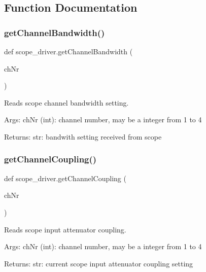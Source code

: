 \subsection{Function Documentation}
\mbox{\label{namespacescope__driver_abaaffe8208b3e65a883429b67db3efb2}} 
\subsubsection{\texorpdfstring{get\+Channel\+Bandwidth()}{getChannelBandwidth()}}
{\footnotesize\ttfamily def scope\+\_\+driver.\+get\+Channel\+Bandwidth (\begin{DoxyParamCaption}\item[{}]{ch\+Nr }\end{DoxyParamCaption})}

\begin{DoxyVerb}Reads scope channel bandwidth setting.

Args:
    chNr (int): channel number, may be a integer from 1 to 4
    
Returns:
    str: bandwith setting received from scope\end{DoxyVerb}
 \mbox{\label{namespacescope__driver_a64d5e53c06b715ca0502076d419552e2}} 
\subsubsection{\texorpdfstring{get\+Channel\+Coupling()}{getChannelCoupling()}}
{\footnotesize\ttfamily def scope\+\_\+driver.\+get\+Channel\+Coupling (\begin{DoxyParamCaption}\item[{}]{ch\+Nr }\end{DoxyParamCaption})}

\begin{DoxyVerb}Reads scope input attenuator coupling.

Args:
    chNr (int): channel number, may be a integer from 1 to 4

Returns:
    str: current scope input attenuator coupling setting
\end{DoxyVerb}
 \mbox{\label{namespacescope__driver_aaba7e69130aab5e96c11cce82a4b50a8}} 
